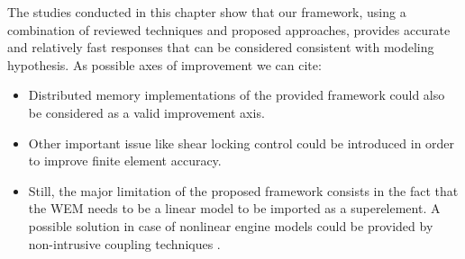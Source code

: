The studies conducted in this chapter show that our framework, using a combination of reviewed techniques and proposed approaches, provides accurate and relatively fast responses that can be considered consistent with modeling hypothesis.
As possible axes of improvement we can cite:
\begin{itemize}
\item Distributed memory implementations of the provided framework could also be considered as a valid improvement axis. 
\item Other important issue like shear locking control could be introduced in order to improve finite element accuracy.
\item  Still, the major limitation of the proposed framework consists in the fact that the WEM needs to be a linear model to be imported as a superelement. A possible solution in case of nonlinear engine models could be provided by non-intrusive coupling techniques \cite{Gendre2009}.
\end{itemize}
